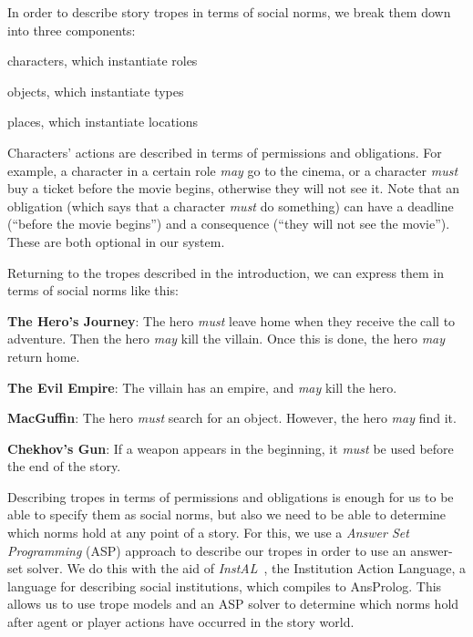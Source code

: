 In order to describe story tropes in terms of social norms, we break them down into three components:

\begin{compactenum}
\item characters, which instantiate roles
\item objects, which instantiate types
\item places, which instantiate locations
\end{compactenum}

Characters' actions are described in terms of permissions and obligations. For example, a character in a certain role \emph{may} go to the cinema, or a character \emph{must} buy a ticket before the movie begins, otherwise they will not see it. Note that an obligation (which says that a character \emph{must} do something) can have a deadline (``before the movie begins'') and a consequence (``they will not see the movie''). These are both optional in our system.

Returning to the tropes described in the introduction, we can express them in terms of social norms like this:

\begin{compactitem}
  \item \textbf{The Hero's Journey}: The hero \emph{must} leave home when they receive the call to adventure. Then the hero \emph{may} kill the villain. Once this is done, the hero \emph{may} return home.
  \item \textbf{The Evil Empire}: The villain has an empire, and \emph{may} kill the hero.
  \item \textbf{MacGuffin}: The hero \emph{must} search for an object. However, the hero \emph{may} find it.
  \item \textbf{Chekhov's Gun}: If a weapon appears in the beginning, it \emph{must} be used before the end of the story.
\end{compactitem}

Describing tropes in terms of permissions and obligations is enough for us to be able to specify them as social norms, but also we need to be able to determine which norms hold at any point of a story. For this, we use a \emph{Answer Set Programming} (ASP) approach to describe our tropes in order to use an answer-set solver. We do this with the aid of \emph{InstAL}~\cite{cliffe2007specifying}, the Institution Action Language, a language for describing social institutions, which compiles to AnsProlog. This allows us to use trope models and an ASP solver to determine which norms hold after agent or player actions have occurred in the story world.

